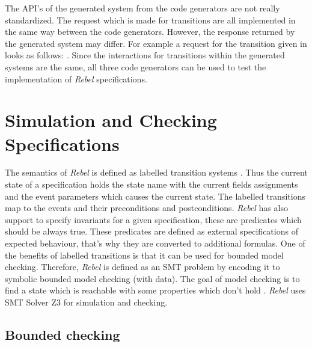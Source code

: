 The API's of the generated system from the code generators are not really standardized. The request which is made for transitions are all implemented in the same way between the code generators. However, the response returned by the generated system may differ.  For example a request for the transition given in \label{fig:account-openaccount-event} looks as follows: . Since the interactions for transitions within the generated systems are the same, all three code generators can be used to test the implementation of \textit{Rebel} specifications.

\section{Simulation and Checking Specifications}


The semantics of \textit{Rebel} is defined as labelled transition systems \cite[p.5]{stoel_storm_vinju_bosman_2016}. Thus the current state of a specification holds the state name with the current fields assignments and the event parameters which causes the current state. The labelled transitions map to the events and their preconditions and postconditions. \textit{Rebel} has also support to specify invariants for a given specification, these are predicates which should be always true. These predicates are defined as external specifications of expected behaviour, that's why they are converted to additional formulas.  One of the benefits of labelled transitions is that it can be used for bounded model checking. Therefore, \textit{Rebel} is defined as an SMT problem by encoding it to symbolic bounded model checking (with data). The goal of model checking is to find a state which is reachable with some properties which don't hold \cite[p.5]{stoel_storm_vinju_bosman_2016}. \textit{Rebel} uses SMT Solver Z3 \cite{moura_bjorner_2008} for simulation and checking.

\subsection{Bounded checking}

